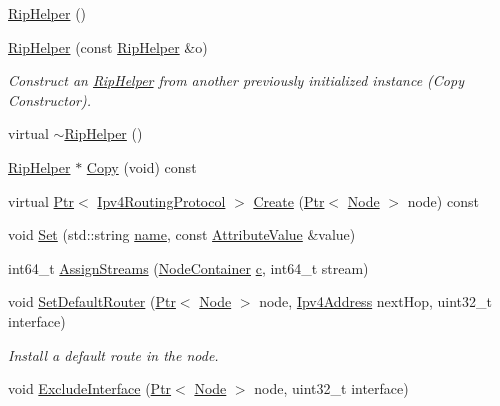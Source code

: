 \begin{DoxyCompactItemize}
\item 
\hyperlink{classns3_1_1RipHelper_afad036c8b8e0cffcff61b92dabb6dd49}{Rip\+Helper} ()
\item 
\hyperlink{classns3_1_1RipHelper_a15938096509bd1d35c630bf0a3dd7645}{Rip\+Helper} (const \hyperlink{classns3_1_1RipHelper}{Rip\+Helper} \&o)
\begin{DoxyCompactList}\small\item\em Construct an \hyperlink{classns3_1_1RipHelper}{Rip\+Helper} from another previously initialized instance (Copy Constructor). \end{DoxyCompactList}\item 
virtual \hyperlink{classns3_1_1RipHelper_acfc6476f2732af99b71af695277a32fc}{$\sim$\+Rip\+Helper} ()
\item 
\hyperlink{classns3_1_1RipHelper}{Rip\+Helper} $\ast$ \hyperlink{classns3_1_1RipHelper_a9d9a8f0f57b1dc853c1d64f860b8510a}{Copy} (void) const 
\item 
virtual \hyperlink{classns3_1_1Ptr}{Ptr}$<$ \hyperlink{classns3_1_1Ipv4RoutingProtocol}{Ipv4\+Routing\+Protocol} $>$ \hyperlink{classns3_1_1RipHelper_af9b89490714b2f494beec7a0f628346b}{Create} (\hyperlink{classns3_1_1Ptr}{Ptr}$<$ \hyperlink{classns3_1_1Node}{Node} $>$ node) const 
\item 
void \hyperlink{classns3_1_1RipHelper_a327e3274275469efd9104fcd625efa4d}{Set} (std\+::string \hyperlink{generate__test__data__lte__spectrum__model_8m_ab74e6bf80237ddc4109968cedc58c151}{name}, const \hyperlink{classns3_1_1AttributeValue}{Attribute\+Value} \&value)
\item 
int64\+\_\+t \hyperlink{classns3_1_1RipHelper_aab9876f8d210bed309773ffc32c5bebe}{Assign\+Streams} (\hyperlink{classns3_1_1NodeContainer}{Node\+Container} \hyperlink{mmwave_2model_2fading-traces_2fading__trace__generator_8m_ae0323a9039add2978bf5b49550572c7c}{c}, int64\+\_\+t stream)
\item 
void \hyperlink{classns3_1_1RipHelper_aa5a16e0f5d8c4f4a7970a3edea703e71}{Set\+Default\+Router} (\hyperlink{classns3_1_1Ptr}{Ptr}$<$ \hyperlink{classns3_1_1Node}{Node} $>$ node, \hyperlink{classns3_1_1Ipv4Address}{Ipv4\+Address} next\+Hop, uint32\+\_\+t interface)
\begin{DoxyCompactList}\small\item\em Install a default route in the node. \end{DoxyCompactList}\item 
void \hyperlink{classns3_1_1RipHelper_a905038e9004aa5df9d7e96c7d1a78c9e}{Exclude\+Interface} (\hyperlink{classns3_1_1Ptr}{Ptr}$<$ \hyperlink{classns3_1_1Node}{Node} $>$ node, uint32\+\_\+t interface)

\end{DoxyCompactItemize}
